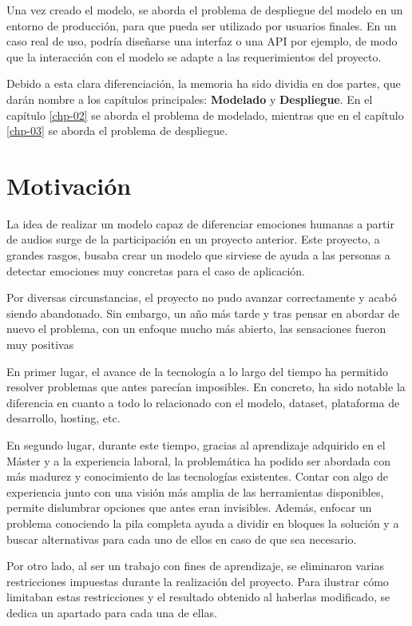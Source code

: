 Una vez creado el modelo, se aborda el problema de despliegue del modelo en un entorno de producción, para que pueda ser utilizado por usuarios finales.
En un caso real de uso, podría diseñarse una interfaz o una API por ejemplo, de modo que la interacción con el modelo se adapte a las requerimientos del proyecto.

Debido a esta clara diferenciación, la memoria ha sido dividia en dos partes, que darán nombre a los capítulos principales: \textbf{Modelado} y \textbf{Despliegue}.
En el capítulo \ref{chp-02} se aborda el problema de modelado, mientras que en el capítulo \ref{chp-03} se aborda el problema de despliegue.

\section{Motivación}\label{sec:motivacion}

La idea de realizar un modelo capaz de diferenciar emociones humanas a partir de audios surge de la participación en un proyecto anterior.
Este proyecto, a grandes rasgos, busaba crear un modelo que sirviese de ayuda a las personas a detectar emociones muy concretas para el caso de aplicación.

Por diversas circunstancias, el proyecto no pudo avanzar correctamente y acabó siendo abandonado.
Sin embargo, un año más tarde y tras pensar en abordar de nuevo el problema, con un enfoque mucho más abierto, las sensaciones fueron muy positivas

En primer lugar, el avance de la tecnología a lo largo del tiempo ha permitido resolver problemas que antes parecían imposibles.
En concreto, ha sido notable la diferencia en cuanto a todo lo relacionado con el modelo, dataset, plataforma de desarrollo, hosting, etc.

En segundo lugar, durante este tiempo, gracias al aprendizaje adquirido en el Máster y a la experiencia laboral, la problemática ha podido ser abordada con más madurez y conocimiento de las tecnologías existentes.
Contar con algo de experiencia junto con una visión más amplia de las herramientas disponibles, permite dislumbrar opciones que antes eran invisibles.
Además, enfocar un problema conociendo la pila completa ayuda a dividir en bloques la solución y a buscar alternativas para cada uno de ellos en caso de que sea necesario.

Por otro lado, al ser un trabajo con fines de aprendizaje, se eliminaron varias restricciones impuestas durante la realización del proyecto.
Para ilustrar cómo limitaban estas restricciones y el resultado obtenido al haberlas modificado, se dedica un apartado para cada una de ellas.

